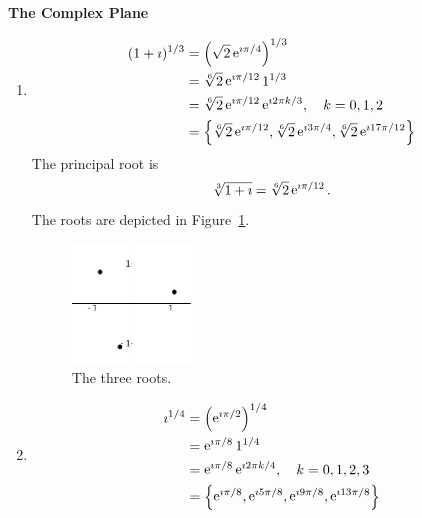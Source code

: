 {%
\begin{large}
  \noindent
  \textbf{The Complex Plane}
\end{large}






\begin{Solution}
  \label{solution 1i13}
  \begin{enumerate}
  \item
    \begin{align*}
      (1 + \imath)^{1/3}
      &= \left( \sqrt{2} \mathop{\mathrm{e}}\nolimits^{\imath \pi/4} \right)^{1/3}
      \\
      &= \sqrt[6]{2} \mathop{\mathrm{e}}\nolimits^{\imath \pi/12} 1^{1/3}
      \\
      &= \sqrt[6]{2} \mathop{\mathrm{e}}\nolimits^{\imath \pi/12} \mathop{\mathrm{e}}\nolimits^{\imath 2 \pi k/3}, \quad k = 0,1,2
      \\
      &= \left\{ \sqrt[6]{2} \mathop{\mathrm{e}}\nolimits^{\imath \pi/12}, \sqrt[6]{2} \mathop{\mathrm{e}}\nolimits^{\imath 3 \pi/4}, 
        \sqrt[6]{2} \mathop{\mathrm{e}}\nolimits^{\imath 17 \pi/12} \right\} 
    \end{align*}
    The principal root is
    \[
    \sqrt[3]{1 + \imath} = \sqrt[6]{2} \mathop{\mathrm{e}}\nolimits^{\imath \pi/12}.
    \]
    The roots are depicted in Figure~\ref{roots-1i13}.
    \begin{figure}[h!]
      \begin{center}
        \includegraphics[width=0.3\textwidth]{fcv/number/roots-1i13}
      \end{center}
      \caption{The three roots.}
      \label{roots-1i13}
    \end{figure}
  \item
    \begin{align*}
      \imath^{1/4}
      &= \left( \e^{\imath \pi/2} \right)^{1/4}
      \\
      &= \e^{\imath \pi/8} 1^{1/4}
      \\
      &= \e^{\imath \pi/8} \e^{\imath 2 \pi k/4}, \quad k = 0,1,2,3
      \\
      &= \left\{ \e^{\imath \pi/8}, \e^{\imath 5 \pi/8}, \e^{\imath 9 \pi/8}, \e^{\imath 13 \pi/8} \right\} 

\end{align*}
\end{enumerate}
\end{Solution}}
